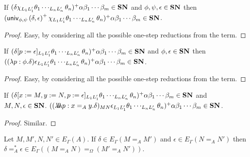 \begin{lemma}
\label{lm:wte_loi1}
If $(\delta \chi_{L_1 L_1'} \theta_1 \cdots_{L_n L_n'} \theta_n)^+ \alpha \beta_1 \cdots \beta_m \in \mathbf{SN}$ and $\phi, \psi, \epsilon \in \mathbf{SN}$ then 
$(\mathsf{univ}_{{\phi} , {\psi}} \left( {\delta} , {\epsilon} \right)^+ \chi_{L_1 L_1'} \theta_1 \cdots_{L_n L_n'} \theta_n)^+ \alpha \beta_1 \cdots \beta_m \in \mathbf{SN}$.
\end{lemma}

\begin{proof}
Easy, by considering all the possible one-step reductions from the term.
\end{proof}

\begin{lemma}
\label{lm:wte_loi2}
If $(\delta[p:=\epsilon]_{L_1 L_1'} \theta_1 \cdots_{L_n L_n'} \theta_n)^+ \alpha \beta_1 \cdots \beta_m \in \mathbf{SN}$ and $\phi, \epsilon \in \mathbf{SN}$ then $((\lambda p : \phi . \delta) \epsilon_{L_1 L_1'} \theta_1 \cdots_{L_n L_n'} \theta_n)^+ \alpha \beta_1 \cdots \beta_m \in \mathbf{SN}$.
\end{lemma}

\begin{proof}
Easy, by considering all the possible one-step reductions from the term.
\end{proof}

\begin{lemma}
\label{lm:wte_loi3}
If $(\delta[x := M, y := N, p := \epsilon]_{L_1 L_1'} \theta_1 \cdots_{L_n L_n'} \theta_n)^+ \alpha \beta_1 \cdots \beta_m \in \mathbf{SN}$ and $M, N, \epsilon \in \mathbf{SN}$.
$((\lambda \!\! \lambda \!\! \lambda p:x =_A y. \delta)_{MN} \epsilon_{L_1 L_1'} \theta_1 \cdots_{L_n L_n'} \theta_n)^+ \alpha \beta_1 \cdots \beta_m \in \mathbf{SN}$.
\end{lemma}

\begin{proof}
Similar.
\end{proof}

\begin{lemma}
Let $M, M', N, N' \in E_\Gamma(A)$.
If $\delta \in E_\Gamma(M =_A M')$ and $\epsilon \in E_\Gamma(N =_A N')$ then
$\delta =_A^* \epsilon \in E_\Gamma((M =_A N) =_\Omega (M' =_A N'))$.
\end{lemma}

